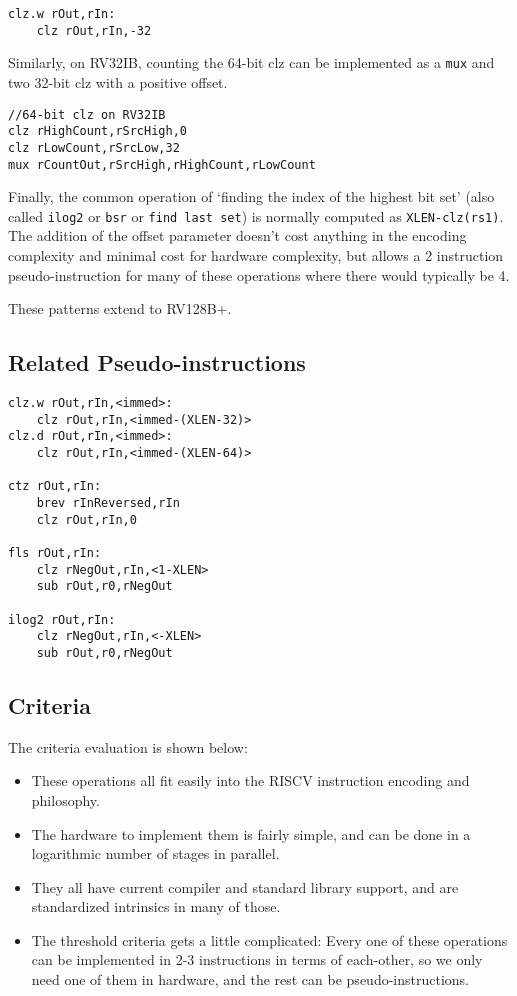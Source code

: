 \begin{verbatim}
clz.w rOut,rIn:
    clz rOut,rIn,-32
\end{verbatim}

Similarly, on RV32IB, counting the 64-bit clz can be implemented as a
\texttt{mux} and two 32-bit clz with a positive offset.

\begin{verbatim}
//64-bit clz on RV32IB
clz rHighCount,rSrcHigh,0
clz rLowCount,rSrcLow,32
mux rCountOut,rSrcHigh,rHighCount,rLowCount
\end{verbatim}

Finally, the common operation of `finding the index of the highest bit
set' (also called \texttt{ilog2} or \texttt{bsr} or
\texttt{find\ last\ set}) is normally computed as
\texttt{XLEN-clz(rs1)}. The addition of the offset parameter doesn't
cost anything in the encoding complexity and minimal cost for hardware
complexity, but allows a 2 instruction pseudo-instruction for many of
these operations where there would typically be 4.

These patterns extend to RV128B+.

\subsection{Related Pseudo-instructions}

\begin{verbatim}
clz.w rOut,rIn,<immed>:
    clz rOut,rIn,<immed-(XLEN-32)>
clz.d rOut,rIn,<immed>:
    clz rOut,rIn,<immed-(XLEN-64)>

ctz rOut,rIn:
    brev rInReversed,rIn
    clz rOut,rIn,0

fls rOut,rIn:
    clz rNegOut,rIn,<1-XLEN>
    sub rOut,r0,rNegOut

ilog2 rOut,rIn:
    clz rNegOut,rIn,<-XLEN>
    sub rOut,r0,rNegOut
\end{verbatim}

\subsection{Criteria}

The criteria evaluation is shown below:

\begin{itemize}
\item
  These operations all fit easily into the RISCV instruction encoding
  and philosophy.
\item
  The hardware to implement them is fairly simple, and can be done in a
  logarithmic number of stages in parallel.
\item
  They all have current compiler and standard library support, and are
  standardized intrinsics in many of those.
\item
  The threshold criteria gets a little complicated: Every one of these
  operations can be implemented in 2-3 instructions in terms of
  each-other, so we only need one of them in hardware, and the rest can
  be pseudo-instructions.
\end{itemize}

